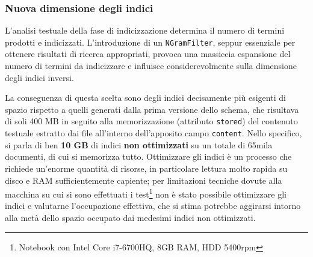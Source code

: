 \vspace{0.5em}




\subsubsection{Nuova dimensione degli indici}

L’analisi testuale della fase di indicizzazione determina il numero di termini prodotti e indicizzati. L’introduzione di un \texttt{NGramFilter}, seppur essenziale per ottenere risultati di ricerca appropriati, provoca una massiccia espansione del numero di termini da indicizzare e influisce considerevolmente sulla dimensione degli indici inversi.

\vspace{1em}

La conseguenza di questa scelta sono degli indici decisamente più esigenti di spazio rispetto a quelli generati dalla prima versione dello schema, che risultava di soli 400 MB in seguito alla memorizzazione (attributo \texttt{stored}) del contenuto testuale estratto dai file all'interno dell'apposito campo \texttt{content}. Nello specifico, si parla di ben \textbf{10 GB} di indici \textbf{non ottimizzati} su un totale di 65mila documenti, di cui si memorizza tutto. Ottimizzare gli indici è un processo che richiede un’enorme quantità di risorse, in particolare lettura molto rapida su disco e RAM sufficientemente capiente; per limitazioni tecniche dovute alla macchina su cui si sono effettuati i test\footnote{Notebook con Intel Core i7-6700HQ, 8GB RAM, HDD 5400rpm} non è stato possibile ottimizzare gli indici e valutarne l’occupazione effettiva, che si stima potrebbe aggirarsi intorno alla metà dello spazio occupato dai medesimi indici non ottimizzati.




